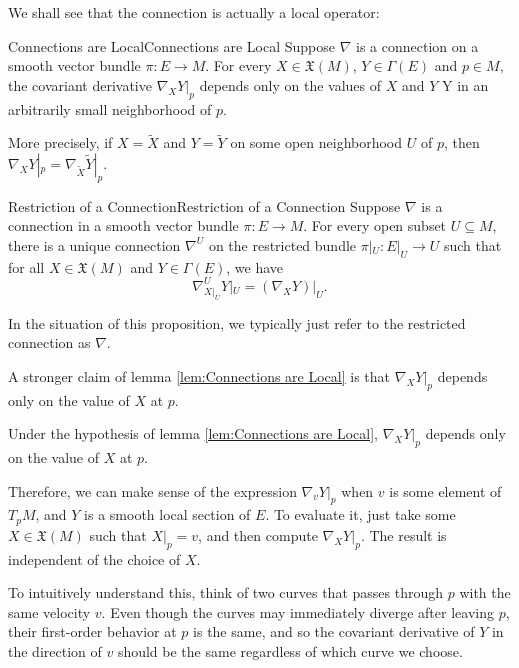 \documentclass[../main.tex]{subfiles}
\begin{document}
We shall see that the connection is actually a local operator:
\begin{lemma}{Connections are Local}{Connections are Local}
	Suppose $\nabla$ is a connection on a smooth vector bundle $\pi: E \to M$. For every $X\in \mathfrak{X}(M)$, $Y \in \Gamma(E)$ and $p \in M$, the covariant derivative $\nabla_X Y|_p$ depends only on the values of $X$ and $Y$ Y in an arbitrarily small neighborhood of $p$.

	More precisely, if $X = \tilde{X}$ and $Y = \tilde{Y}$ on some open neighborhood $U$ of $p$, then $\nabla_X Y|_p = \nabla_{\tilde{X}} \tilde{Y}|_p$.
\end{lemma}

\begin{proposition}{Restriction of a Connection}{Restriction of a Connection}
	Suppose $\nabla$ is a connection in a smooth vector bundle $\pi: E \to M$. For every open subset $U \subseteq M$, there is a unique connection $\nabla^U$ on the restricted bundle $\pi|_U: E|_U \to U$ such that for all $X \in \mathfrak{X}(M)$ and $Y \in \Gamma(E)$, we have
	\begin{equation}
		\nabla^U_{X|_U} Y|_U = (\nabla_X Y)|_U.
	\end{equation}
\end{proposition}
In the situation of this proposition, we typically just refer to the restricted connection as $\nabla$.

A stronger claim of lemma \ref{lem:Connections are Local} is that $\nabla_X Y|_p$ depends only on the value of $X$ at $p$.
\begin{proposition}{}{}
	Under the hypothesis of lemma \ref{lem:Connections are Local}, $\nabla_X Y|_p$ depends only on the value of $X$ at $p$.
\end{proposition}

Therefore, we can make sense of the expression $\nabla_v Y|_p$ when $v$ is some element of $T_p M$, and $Y$ is a smooth local section of $E$. To evaluate it, just take some $X \in \mathfrak{X}(M)$ such that $X|_p = v$, and then compute $\nabla_X Y|_p$. The result is independent of the choice of $X$.

\begin{remark}
	To intuitively understand this, think of two curves that passes through $p$ with the same velocity $v$. Even though the curves may immediately diverge after leaving $p$, their first-order behavior at $p$ is the same, and so the covariant derivative of $Y$ in the direction of $v$ should be the same regardless of which curve we choose.
\end{remark}
\end{document}
